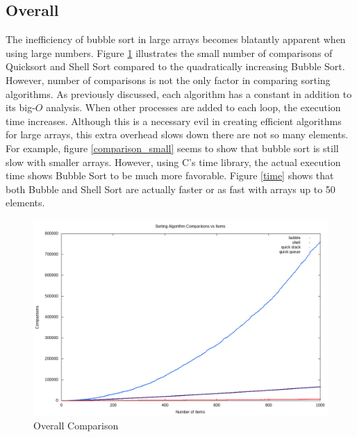 \documentclass[12pt]{article}
\begin{document}

	\subsection{Overall}

	The inefficiency of bubble sort in large arrays becomes blatantly apparent when using large numbers.
	Figure \ref{comparison} illustrates the small number of comparisons of Quicksort and Shell Sort compared to the quadratically increasing Bubble Sort.
	However, number of comparisons is not the only factor in comparing sorting algorithms.
	As previously discussed, each algorithm has a constant in addition to its big-$O$ analysis.
	When other processes are added to each loop, the execution time increases.
	Although this is a necessary evil in creating efficient algorithms for large arrays, this extra overhead slows down there are not so many elements.
	For example, figure \ref{comparison_small} seems to show that bubble sort is still slow with smaller arrays.
	However, using C's time library, the actual execution time shows Bubble Sort to be much more favorable.
	Figure \ref{time} shows that both Bubble and Shell Sort are actually faster or as fast with arrays up to 50 elements.
	
	\begin{figure}[H]
		\caption{Overall Comparison}\label{comparison}
		\includegraphics[width=6in]{comparison}
		\centering
	\end{figure}
\end{document}
